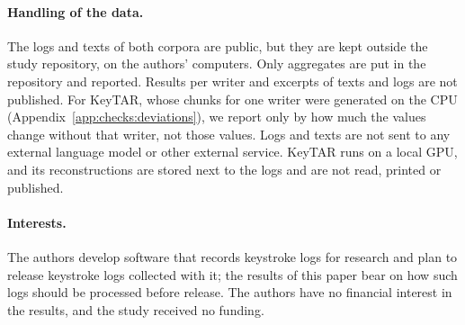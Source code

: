 \begin{ethics}
\paragraph{Handling of the data.}
The logs and texts of both corpora are public, but they are kept outside the study repository, on the authors'
computers. Only aggregates are put in the repository and reported. Results per writer and excerpts of texts and logs
are not published. For KeyTAR, whose chunks for one writer were generated on the CPU
(Appendix~\ref{app:checks:deviations}), we report only by how much the values change without that writer, not those
values. Logs and texts are not sent to any external language model or other external service. KeyTAR runs
on a local GPU, and its reconstructions are stored next to the logs and are not read, printed or published.

\paragraph{Interests.}
The authors develop software that records keystroke logs for research and plan to release keystroke logs collected
with it; the results of this paper bear on how such logs should be processed before release. The authors have no
financial interest in the results, and the study received no funding.
\end{ethics}
